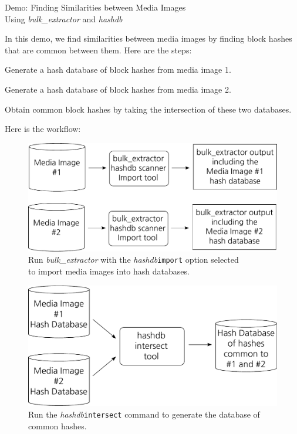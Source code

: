 \documentclass[12pt,twoside]{article}
\newcommand{\hdb}{\emph{hashdb}\xspace}
\newcommand{\bulk}{\emph{bulk\_extractor}\xspace}
\begin{document}
\begin{center}
\Large Demo: Finding Similarities between Media Images \\
\large Using \bulk and \hdb
\end{center}

In this demo, we find similarities between media images
by finding block hashes that are common between them.
Here are the steps:
\begin{compactenum}
\item Generate a hash database of block hashes from media image 1.
\item Generate a hash database of block hashes from media image 2.
\item Obtain common block hashes
by taking the intersection of these two databases.
\end{compactenum}
Here is the workflow:
\begin{figure}[H]
  \center
  \includegraphics[scale=0.6]{drawings/import_hashes}
  \caption*{Run \bulk with the \hdb \texttt{import} option selected \\
            to import media images into hash databases.}
\end{figure}

\begin{figure}[H]
  \center
  \includegraphics[scale=0.6]{drawings/intersect_hashes}
  \caption*{Run the \hdb \texttt{intersect} command
            to generate the database of common hashes.}
\end{figure}
\end{document}
